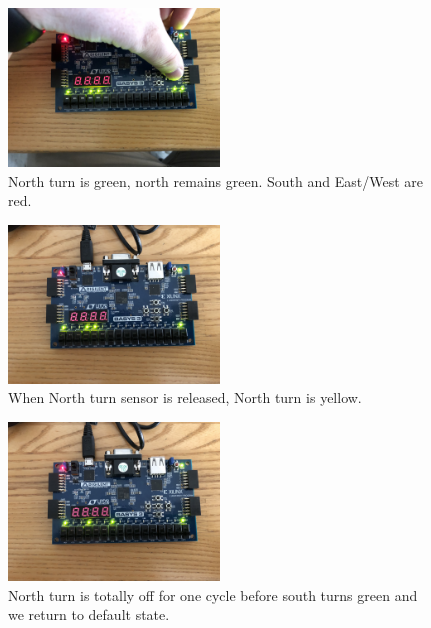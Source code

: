 \documentclass[11pt]{article}
\begin{document}
\begin{figure}[H]
\begin{center}
	\includegraphics[width=0.5\textwidth]{./images/Part2/l9p2img4.jpg}
	\caption{\label{fig:part2_img4}North turn is green, north remains green. South and East/West are red.}
\end{center}
\end{figure}

\begin{figure}[H]
\begin{center}
	\includegraphics[width=0.5\textwidth]{./images/Part2/l9p2img5.jpg}
	\caption{\label{fig:part2_img5}When North turn sensor is released, North turn is yellow.}
\end{center}
\end{figure}

\begin{figure}[H]
\begin{center}
	\includegraphics[width=0.5\textwidth]{./images/Part2/l9p2img6.jpg}
	\caption{\label{fig:part2_img6}North turn is totally off for one cycle before south turns green and we return to default state.}
\end{center}
\end{figure}
\end{document}
